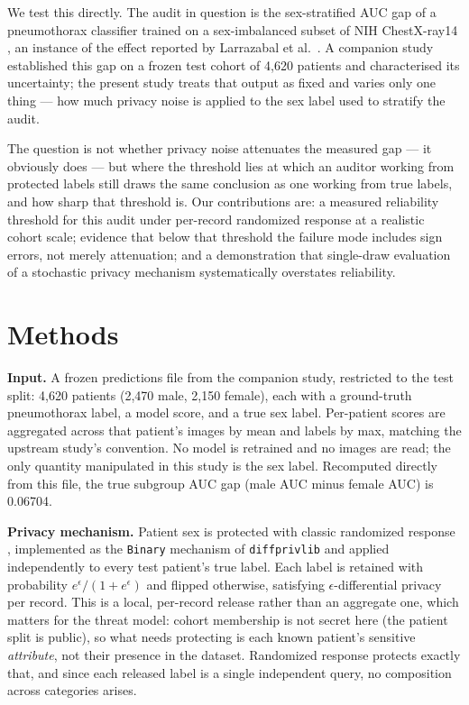 \documentclass[11pt]{article}
\begin{document}
We test this directly. The audit in question is the sex-stratified AUC gap of a pneumothorax classifier trained on a sex-imbalanced subset of NIH ChestX-ray14 \cite{wang2017}, an instance of the effect reported by Larrazabal et al.\ \cite{larrazabal2020}. A companion study established this gap on a frozen test cohort of 4,620 patients and characterised its uncertainty; the present study treats that output as fixed and varies only one thing --- how much privacy noise is applied to the sex label used to stratify the audit.

The question is not whether privacy noise attenuates the measured gap --- it obviously does --- but where the threshold lies at which an auditor working from protected labels still draws the same conclusion as one working from true labels, and how sharp that threshold is. Our contributions are: a measured reliability threshold for this audit under per-record randomized response at a realistic cohort scale; evidence that below that threshold the failure mode includes sign errors, not merely attenuation; and a demonstration that single-draw evaluation of a stochastic privacy mechanism systematically overstates reliability.

\section{Methods}

\textbf{Input.} A frozen predictions file from the companion study, restricted to the test split: 4,620 patients (2,470 male, 2,150 female), each with a ground-truth pneumothorax label, a model score, and a true sex label. Per-patient scores are aggregated across that patient's images by mean and labels by max, matching the upstream study's convention. No model is retrained and no images are read; the only quantity manipulated in this study is the sex label. Recomputed directly from this file, the true subgroup AUC gap (male AUC minus female AUC) is 0.06704.

\textbf{Privacy mechanism.} Patient sex is protected with classic randomized response \cite{warner1965}, implemented as the \texttt{Binary} mechanism of \texttt{diffprivlib} \cite{holohan2019} and applied independently to every test patient's true label. Each label is retained with probability $e^{\epsilon}/(1+e^{\epsilon})$ and flipped otherwise, satisfying $\epsilon$-differential privacy per record. This is a local, per-record release rather than an aggregate one, which matters for the threat model: cohort membership is not secret here (the patient split is public), so what needs protecting is each known patient's sensitive \emph{attribute}, not their presence in the dataset. Randomized response protects exactly that, and since each released label is a single independent query, no composition across categories arises.
\end{document}
